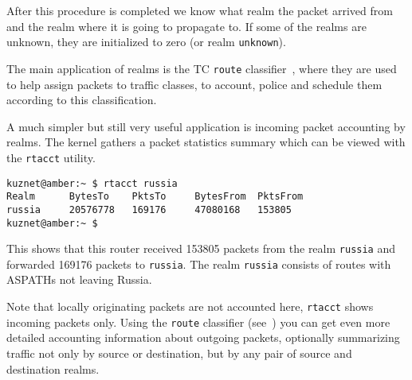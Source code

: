 After this procedure is completed we know what realm the packet
arrived from and the realm where it is going to propagate to.
If some of the realms are unknown, they are initialized to zero
(or realm \verb|unknown|).

The main application of realms is the TC \verb|route| classifier~\cite{TC-CREF},
where they are used to help assign packets to traffic classes,
to account, police and schedule them according to this
classification.

A much simpler but still very useful application is incoming packet
accounting by realms. The kernel gathers a packet statistics summary
which can be viewed with the \verb|rtacct| utility.
\begin{verbatim}
kuznet@amber:~ $ rtacct russia
Realm      BytesTo    PktsTo     BytesFrom  PktsFrom   
russia     20576778   169176     47080168   153805     
kuznet@amber:~ $
\end{verbatim}
This shows that this router received 153805 packets from
the realm \verb|russia| and forwarded 169176 packets to \verb|russia|.
The realm \verb|russia| consists of routes with ASPATHs not leaving
Russia.

Note that locally originating packets are not accounted here,
\verb|rtacct| shows incoming packets only. Using the \verb|route|
classifier (see~\cite{TC-CREF}) you can get even more detailed
accounting information about outgoing packets, optionally
summarizing traffic not only by source or destination, but
by any pair of source and destination realms.


